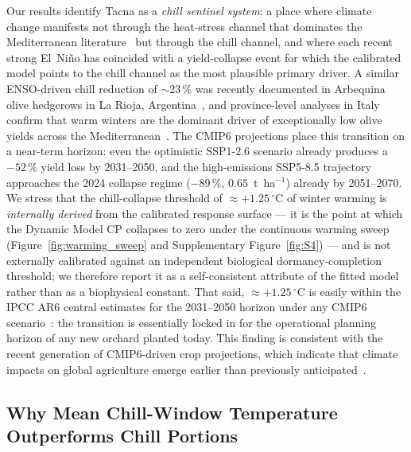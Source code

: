 \documentclass[agronomy,article,submit,pdftex,moreauthors]{Definitions/mdpi}
\begin{document}
Our results identify Tacna as a \emph{chill sentinel system}: a place where climate change manifests not through the heat-stress channel that dominates the Mediterranean literature~\cite{aguilera2014,fraga2020,mairech2021} but through the chill channel, and where each recent strong El~Ni\~{n}o has coincided with a yield-collapse event for which the calibrated model points to the chill channel as the most plausible primary driver. A similar ENSO-driven chill reduction of ${\sim}23\,\%$ was recently documented in Arbequina olive hedgerows in La Rioja, Argentina~\cite{calvo2024enso}, and province-level analyses in Italy confirm that warm winters are the dominant driver of exceptionally low olive yields across the Mediterranean~\cite{dipaola2023olive}. The CMIP6 projections place this transition on a near-term horizon: even the optimistic SSP1-2.6 scenario already produces a $-52\,\%$ yield loss by 2031--2050, and the high-emissions SSP5-8.5 trajectory approaches the 2024 collapse regime ($-89\,\%$, $0.65$~t~ha$^{-1}$) already by 2051--2070. We stress that the chill-collapse threshold of $\approx +1.25\,^\circ$C of winter warming is \emph{internally derived} from the calibrated response surface --- it is the point at which the Dynamic Model CP collapses to zero under the continuous warming sweep (Figure~\ref{fig:warming_sweep} and Supplementary Figure~\ref{fig:S4}) --- and is not externally calibrated against an independent biological dormancy-completion threshold; we therefore report it as a self-consistent attribute of the fitted model rather than as a biophysical constant. That said, $\approx +1.25\,^\circ$C is easily within the IPCC AR6 central estimates for the 2031--2050 horizon under any CMIP6 scenario~\cite{ipcc2021atlas}: the transition is essentially locked in for the operational planning horizon of any new orchard planted today. This finding is consistent with the recent generation of CMIP6-driven crop projections, which indicate that climate impacts on global agriculture emerge earlier than previously anticipated~\cite{jagermeyr2021}.

\subsection{Why Mean Chill-Window Temperature Outperforms Chill Portions}
\label{sec:discuss_tchill}
\end{document}
